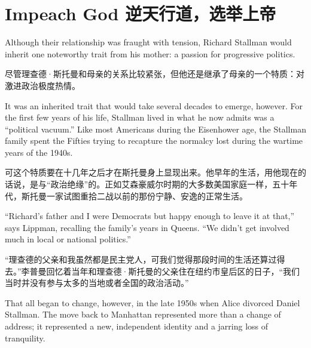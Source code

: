 
\chapter{\ifdefined\eng
Impeach God
\fi
\ifdefined\chs
逆天行道，选举上帝
\fi}

\ifdefined\eng
Although their relationship was fraught with tension, Richard Stallman would inherit one noteworthy trait from his mother: a passion for progressive politics.
\fi

\ifdefined\chs
尽管理查德·斯托曼和母亲的关系比较紧张，但他还是继承了母亲的一个特质：对激进政治极度热情。
\fi

\ifdefined\eng
It was an inherited trait that would take several decades to emerge, however. For the first few years of his life, Stallman lived in what he now admits was a ``political vacuum.'' Like most Americans during the Eisenhower age, the Stallman family spent the Fifties trying to recapture the normalcy lost during the wartime years of the 1940s.
\fi

\ifdefined\chs
可这个特质要在十几年之后才在斯托曼身上显现出来。他早年的生活，用他现在的话说，是与``政治绝缘''的。正如艾森豪威尔时期的大多数美国家庭一样，五十年代，斯托曼一家试图重拾二战以前的那份宁静、安逸的正常生活。
\fi

\ifdefined\eng
``Richard's father and I were Democrats but happy enough to leave it at that,'' says Lippman, recalling the family's years in Queens. ``We didn't get involved much in local or national politics.''
\fi

\ifdefined\chs
``理查德的父亲和我虽然都是民主党人，可我们觉得那段时间的生活还算过得去。''李普曼回忆着当年和理查德·斯托曼的父亲住在纽约市皇后区的日子，``我们当时并没有参与太多的当地或者全国的政治活动。''
\fi

\ifdefined\eng
That all began to change, however, in the late 1950s when Alice divorced Daniel Stallman. The move back to Manhattan represented more than a change of address; it represented a new, independent identity and a jarring loss of tranquility.
\fi

